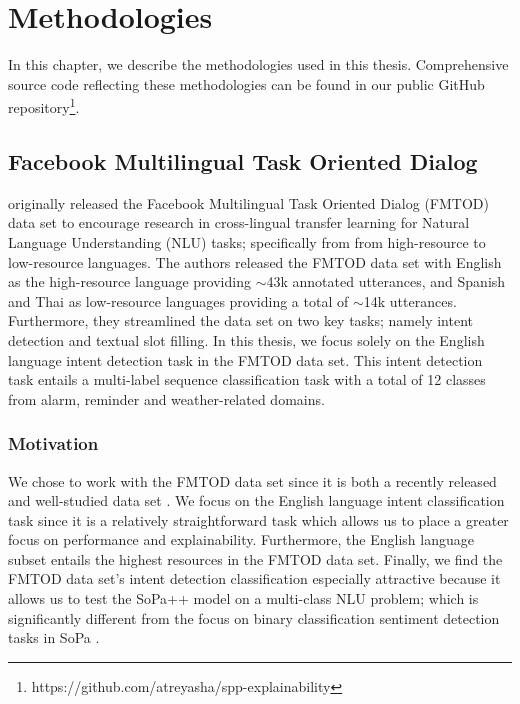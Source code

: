 \chapter{Methodologies}

\label{chapter:methodologies}

In this chapter, we describe the methodologies used in this thesis.
Comprehensive source code reflecting these methodologies can be found in our
public GitHub
repository\footnote{https://github.com/atreyasha/spp-explainability}.

\section{Facebook Multilingual Task Oriented Dialog}

\citet{schuster-etal-2019-cross-lingual} originally released the Facebook
Multilingual Task Oriented Dialog (FMTOD) data set to encourage research in
cross-lingual transfer learning for Natural Language Understanding (NLU) tasks;
specifically from from high-resource to low-resource languages. The authors
released the FMTOD data set with English as the high-resource language providing
$\sim$43k annotated utterances, and Spanish and Thai as low-resource languages
providing a total of $\sim$14k utterances. Furthermore, they streamlined the
data set on two key tasks; namely intent detection and textual slot filling. In
this thesis, we focus solely on the English language intent detection task in
the FMTOD data set. This intent detection task entails a multi-label sequence
classification task with a total of 12 classes from alarm, reminder and
weather-related domains.

\subsection{Motivation}

We chose to work with the FMTOD data set since it is both a recently released
and well-studied data set
\citep{schuster-etal-2019-cross-lingual,zhang2019joint,zhang-etal-2020-intent}.
We focus on the English language intent classification task since it is a
relatively straightforward task which allows us to place a greater focus on
performance and explainability. Furthermore, the English language subset entails
the highest resources in the FMTOD data set. Finally, we find the FMTOD data
set's intent detection classification especially attractive because it allows us
to test the SoPa++ model on a multi-class NLU problem; which is significantly
different from the focus on binary classification sentiment detection tasks in
SoPa \citep{schwartz2018sopa}.

